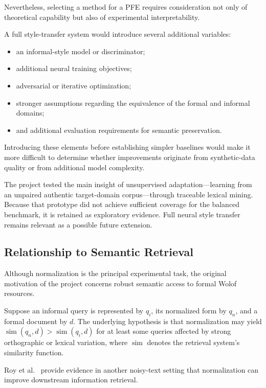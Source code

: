 \documentclass[12pt, a4paper, twoside, openany]{report}
\begin{document}
Nevertheless, selecting a method for a PFE requires consideration not only of theoretical capability but also of experimental interpretability.

A full style-transfer system would introduce several additional variables:

\begin{itemize}
	\item an informal-style model or discriminator;
	\item additional neural training objectives;
	\item adversarial or iterative optimization;
	\item stronger assumptions regarding the equivalence of the formal and informal domains;
	\item and additional evaluation requirements for semantic preservation.
\end{itemize}

Introducing these elements before establishing simpler baselines would make it more difficult to determine whether improvements originate from synthetic-data quality or from additional model complexity.

The project tested the main insight of unsupervised adaptation---learning from an unpaired authentic target-domain corpus---through traceable lexical mining. Because that prototype did not achieve sufficient coverage for the balanced benchmark, it is retained as exploratory evidence. Full neural style transfer remains relevant as a possible future extension.


\subsection{Relationship to Semantic Retrieval}

Although normalization is the principal experimental task, the original motivation of the project concerns robust semantic access to formal Wolof resources.

Suppose an informal query is represented by $q_i$, its normalized form by $q_n$, and a formal document by $d$. The underlying hypothesis is that normalization may yield $\operatorname{sim}(q_n,d)>\operatorname{sim}(q_i,d)$ for at least some queries affected by strong orthographic or lexical variation, where $\operatorname{sim}$ denotes the retrieval system's similarity function.

Roy et al.~\cite{roy2021normalization} provide evidence in another noisy-text setting that normalization can improve downstream information retrieval.
\end{document}
